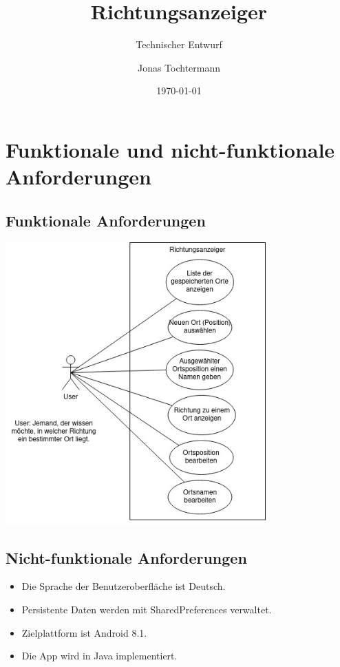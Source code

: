 \documentclass[12pt,a4paper]{scrartcl}
\title{Richtungsanzeiger}
\subtitle{Technischer Entwurf}
\author{Jonas Tochtermann}
\date{\today}
\begin{document}
\maketitle

\section{Funktionale und nicht-funktionale Anforderungen}


\subsection{Funktionale Anforderungen}

\includegraphics[width=10.0cm]{../UseCase.jpg}

\subsection{Nicht-funktionale Anforderungen}

\begin{itemize}
  \item Die Sprache der Benutzeroberfläche ist Deutsch.
  \item Persistente Daten werden mit SharedPreferences verwaltet.
  \item Zielplattform ist Android 8.1.
  \item Die App wird in Java implementiert.
\end{itemize}
\end{document}
